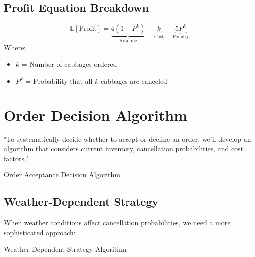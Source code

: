 \documentclass[11pt]{article}
\begin{document}
\subsection*{Profit Equation Breakdown}
\begin{equation*}
\mathbb{E}[\text{Profit}] = \underbrace{4(1-P^k)}_{\text{Revenue}} - 
\underbrace{k}_{\text{Cost}} - 
\underbrace{5P^k}_{\text{Penalty}}
\end{equation*}
Where:
\begin{itemize}
  \item \( k \) = Number of cabbages ordered
  \item \( P^k \) = Probability that all \( k \) cabbages are canceled
\end{itemize}

\section*{Order Decision Algorithm}
\begin{thoughtbox}
"To systematically decide whether to accept or decline an order, we'll develop an algorithm that considers current inventory, cancellation probabilities, and cost factors."
\end{thoughtbox}

\begin{algorithm}[H]
\caption{Order Acceptance Decision Algorithm}
\end{algorithm}

\subsection*{Weather-Dependent Strategy}
When weather conditions affect cancellation probabilities, we need a more sophisticated approach:

\begin{algorithm}[H]
\caption{Weather-Dependent Strategy Algorithm}
\end{algorithm}
\end{document}
